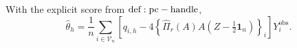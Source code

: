 With the explicit score from \({\rm def:pc-handle}\),
\[
 \widehat\theta_h
 =\frac1n\sum_{i\in\mathcal V_n}
 \left[q_{i,h}-4\left\{\widehat\Pi_r(A)A
       (Z-\tfrac12\mathbf1_n)\right\}_i\right]Y_i^{\mathrm{obs}}.
\]